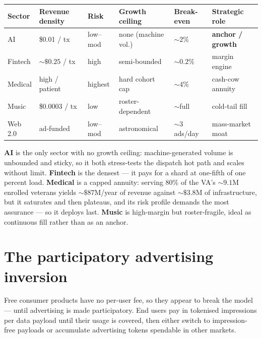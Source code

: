 \documentclass[11pt]{article}
\begin{document}
\begin{center}
\renewcommand{\arraystretch}{1.25}
\begin{tabular}{@{}llllll@{}}
\toprule
\rowcolor{headrow}
\textbf{Sector} & \textbf{Revenue density} & \textbf{Risk} & \textbf{Growth ceiling} & \textbf{Break-even} & \textbf{Strategic role} \\
\midrule
AI       & \$0.01 / tx        & low--mod & none (machine vol.) & ${\sim}2\%$   & \textbf{anchor / growth} \\
Fintech  & ${\sim}\$0.25$ / tx & high     & semi-bounded        & ${\sim}0.2\%$ & margin engine \\
Medical  & high / patient     & highest  & hard cohort cap     & ${\sim}4\%$   & cash-cow annuity \\
Music    & \$0.0003 / tx      & low      & roster-dependent    & ${\sim}$full  & cold-tail fill \\
Web 2.0  & ad-funded          & low--mod & astronomical        & ${\sim}3$ ads/day & mass-market moat \\
\bottomrule
\end{tabular}
\end{center}

\textbf{AI} is the only sector with no growth ceiling: machine-generated volume is unbounded and sticky, so it both stress-tests the dispatch hot path and scales without limit. \textbf{Fintech} is the densest --- it pays for a shard at one-fifth of one percent load. \textbf{Medical} is a capped annuity: serving 80\% of the VA's ${\sim}9.1$M enrolled veterans yields ${\sim}\$87$M/year of revenue against ${\sim}\$3.8$M of infrastructure, but it saturates and then plateaus, and its risk profile demands the most assurance --- so it deploys last. \textbf{Music} is high-margin but roster-fragile, ideal as continuous fill rather than as an anchor.

\section{The participatory advertising inversion}

Free consumer products have no per-user fee, so they appear to break the model --- until advertising is made participatory. End users pay in tokenised impressions per data payload until their usage is covered, then either switch to impression-free payloads or accumulate advertising tokens spendable in other markets.
\end{document}
